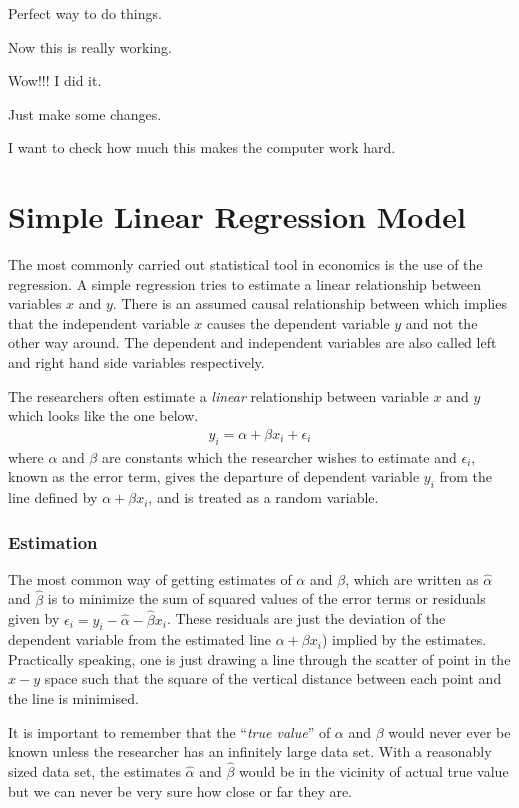 \documentclass[12pt,onesided]{article}
\begin{document}
Perfect way to do things.

Now this is really working.

Wow!!! I did it.

Just make some changes.

I want to check how much this makes the computer work hard.

\section{Simple Linear Regression Model}

The most commonly carried out statistical tool in economics is the use of the regression. A simple regression tries to estimate a
linear relationship between variables $x$ and $y$. There is an
assumed causal relationship between which implies that the
independent variable $x$ causes the dependent variable $y$ and not
the other way around. The dependent and independent variables are
also called left and right hand side variables respectively.

The researchers often estimate a \emph{linear} relationship between
variable $x$ and $y$ which looks like the one below.
\begin{align*}
    y_i= \alpha + \beta x_i + \epsilon_i
\end{align*}
where $\alpha$ and $\beta$ are constants which the researcher wishes
to estimate and $\epsilon_i$, known as the error term, gives the
departure of dependent variable $y_i$ from the line defined by
$\alpha + \beta x_i$, and is treated as a random variable.

\subsubsection*{Estimation}

The most common way of getting estimates of $\alpha$ and $\beta$, which are written as $\hat{\alpha}$ and $\hat{\beta}$ is to minimize the sum of squared values of the error terms or residuals given by $\epsilon_i=y_i-\hat{\alpha}-\hat{\beta}x_i$. These residuals are just the deviation of the dependent variable from the estimated line $\alpha + \beta x_i$) implied by the estimates. Practically speaking, one is just drawing a line through the scatter of point in the $x-y$ space such that the square of the vertical distance between each point and the line is minimised.

It is important to remember that the ``\emph{true value}'' of
$\alpha$ and $\beta$ would never ever be known unless the researcher
has an infinitely large data set. With a reasonably sized data set,
the estimates $\hat{\alpha}$ and $\hat{\beta}$ would be in the
vicinity of actual true value but we can never be very sure how
close or far they are.
\end{document}
